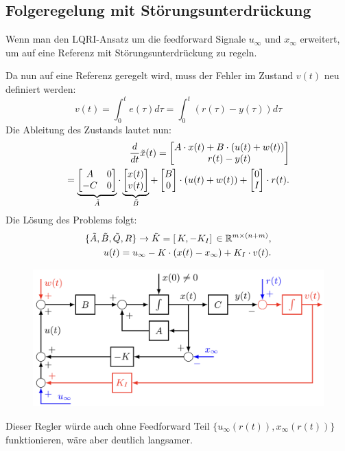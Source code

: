 \subsection{Folgeregelung mit Störungsunterdrückung}
    Wenn man den LQRI-Ansatz um die feedforward Signale $u_\infty$ und $x_\infty$ erweitert, um auf eine Referenz mit Störungsunterdrückung zu regeln.
    
    Da nun auf eine Referenz geregelt wird, muss der Fehler im Zustand $ v(t)$ neu definiert werden: 
    \[v(t) = \int^t_0e(\tau)d\tau = \int^t_0(r(\tau)-y(\tau))d\tau\]
    Die Ableitung des Zustands lautet nun: 
    \begin{align*}
        \frac{d}{dt}\Tilde{x}(t) = \begin{bmatrix}A\cdot x(t) + B \cdot ( u(t) + w(t))\\r(t)-y(t)\end{bmatrix}\\
        = \underbrace{\begin{bmatrix}A&0\\-C & 0\end{bmatrix}}_{\Tilde{A}}\cdot\underbrace{\begin{bmatrix}x(t) \\v(t)\end{bmatrix}}_{\Tilde{B}}+\begin{bmatrix}B \\ 0 \end{bmatrix} \cdot(u(t)+w(t))+\begin{bmatrix}0 \\I\end{bmatrix}\cdot r(t).
    \end{align*}
    Die Lösung des Problems folgt:
    \begin{align*}
        \{\Tilde{A},\Tilde{B},\Tilde{Q},R\}\rightarrow \Tilde{K}=[\,K, - K_I]\, \in \mathbb{R}^{m\times(n+m)},\\
        u(t) = u_\infty-K\cdot(x(t)-x_\infty)+K_I\cdot v(t).
    \end{align*}
    
    \begin{figure}[H]
        \centering
        \includegraphics[width = 0.7\linewidth]{images/08/LQR_Folgereg_distreject.jpeg}
    \end{figure}
    Dieser Regler würde auch ohne Feedforward Teil $\{u_\infty(r(t)), x_\infty(r(t))\}$ funktionieren, wäre aber deutlich langsamer.

